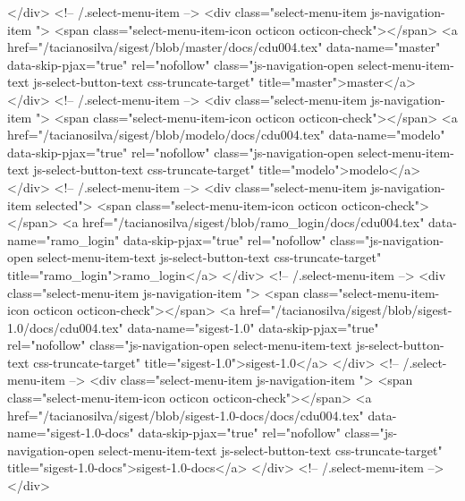             </div> <!-- /.select-menu-item -->
            <div class="select-menu-item js-navigation-item ">
              <span class="select-menu-item-icon octicon octicon-check"></span>
              <a href="/tacianosilva/sigest/blob/master/docs/cdu004.tex"
                 data-name="master"
                 data-skip-pjax="true"
                 rel="nofollow"
                 class="js-navigation-open select-menu-item-text js-select-button-text css-truncate-target"
                 title="master">master</a>
            </div> <!-- /.select-menu-item -->
            <div class="select-menu-item js-navigation-item ">
              <span class="select-menu-item-icon octicon octicon-check"></span>
              <a href="/tacianosilva/sigest/blob/modelo/docs/cdu004.tex"
                 data-name="modelo"
                 data-skip-pjax="true"
                 rel="nofollow"
                 class="js-navigation-open select-menu-item-text js-select-button-text css-truncate-target"
                 title="modelo">modelo</a>
            </div> <!-- /.select-menu-item -->
            <div class="select-menu-item js-navigation-item selected">
              <span class="select-menu-item-icon octicon octicon-check"></span>
              <a href="/tacianosilva/sigest/blob/ramo_login/docs/cdu004.tex"
                 data-name="ramo_login"
                 data-skip-pjax="true"
                 rel="nofollow"
                 class="js-navigation-open select-menu-item-text js-select-button-text css-truncate-target"
                 title="ramo_login">ramo_login</a>
            </div> <!-- /.select-menu-item -->
            <div class="select-menu-item js-navigation-item ">
              <span class="select-menu-item-icon octicon octicon-check"></span>
              <a href="/tacianosilva/sigest/blob/sigest-1.0/docs/cdu004.tex"
                 data-name="sigest-1.0"
                 data-skip-pjax="true"
                 rel="nofollow"
                 class="js-navigation-open select-menu-item-text js-select-button-text css-truncate-target"
                 title="sigest-1.0">sigest-1.0</a>
            </div> <!-- /.select-menu-item -->
            <div class="select-menu-item js-navigation-item ">
              <span class="select-menu-item-icon octicon octicon-check"></span>
              <a href="/tacianosilva/sigest/blob/sigest-1.0-docs/docs/cdu004.tex"
                 data-name="sigest-1.0-docs"
                 data-skip-pjax="true"
                 rel="nofollow"
                 class="js-navigation-open select-menu-item-text js-select-button-text css-truncate-target"
                 title="sigest-1.0-docs">sigest-1.0-docs</a>
            </div> <!-- /.select-menu-item -->
        </div>

